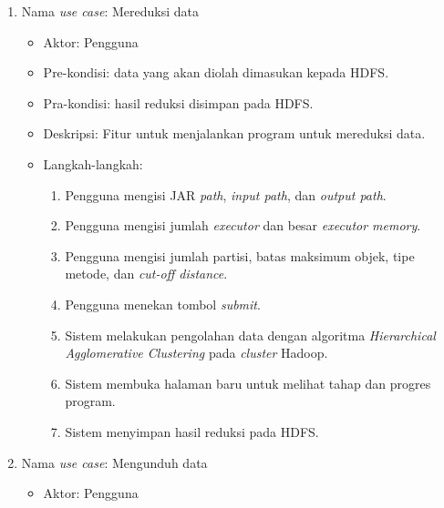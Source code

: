 \begin{enumerate}

\item Nama \textit{use case}: Mereduksi data

\begin{itemize}
\item Aktor: Pengguna

\item Pre-kondisi: data yang akan diolah dimasukan kepada HDFS.

\item Pra-kondisi: hasil reduksi disimpan pada HDFS.

\item Deskripsi: Fitur untuk menjalankan program untuk mereduksi data.

\item Langkah-langkah:

\begin{enumerate}

\item Pengguna mengisi JAR \textit{path}, \textit{input path}, dan \textit{output path}.

\item Pengguna mengisi jumlah \textit{executor} dan besar \textit{executor memory}.

\item Pengguna mengisi jumlah partisi, batas maksimum objek, tipe metode, dan \textit{cut-off distance}. 

\item Pengguna menekan tombol \textit{submit}.

\item Sistem melakukan pengolahan data dengan algoritma \textit{Hierarchical Agglomerative Clustering} pada \textit{cluster} Hadoop.

\item Sistem membuka halaman baru untuk melihat tahap dan progres program.

\item Sistem menyimpan hasil reduksi pada HDFS.
\end{enumerate}

\end{itemize}


\item Nama \textit{use case}: Mengunduh data

\begin{itemize}
\item Aktor: Pengguna


\end{itemize}
\end{enumerate}
